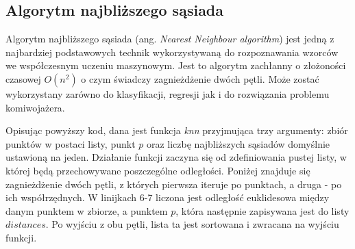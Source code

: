 \documentclass{article}
\begin{document}
\subsection*{\LARGE{Algorytm najbliższego sąsiada}} 

Algorytm najbliższego sąsiada (ang. \emph{Nearest Neighbour algorithm}) jest jedną z najbardziej podstawowych technik wykorzystywaną do rozpoznawania wzorców we współczesnym uczeniu maszynowym. Jest to algorytm zachłanny o złożoności czasowej $O(n^2)$ o czym świadczy zagnieżdżenie dwóch pętli. Może zostać wykorzystany zarówno do klasyfikacji, regresji jak i do rozwiązania problemu komiwojażera. 

\begin{comment}
Chcąc znaleźć najlepsze dopasowanie między dwoma zbiorami punktów potrzebujemy miary tego dopasowania. W tym celu posługujemy sumą odległości korespondujących punktów w metryce euklidesowej. Jeśli przyjmiemy, że po pomiarze odległości danego punktu - staje się on odwiedzony, taką metodę możemy rozpatrywać posługując się terminologią typową dla teorii grafów. Podany algorytm da się rozpisać w postaci listy kroków.

\begin{enumerate}
\item Ustawienie statutu wszystkich punktów jako nieodwiedzone.
\item Wybranie jednego z nich i zmierzenie odległości między nim a punktem $\vb{p}$.
\item Znalezienie najkrótszej odległości między 
\end{enumerate}
\end{comment}

\vspace{5mm}

\vspace{5mm}

Opisując powyższy kod, dana jest funkcja \emph{knn} przyjmująca trzy argumenty: zbiór punktów w postaci listy, punkt $p$ oraz liczbę najbliższych sąsiadów domyślnie ustawioną na jeden. Działanie funkcji zaczyna się od zdefiniowania pustej listy, w której będą przechowywane poszczególne odległości. Poniżej znajduje się zagnieżdżenie dwóch pętli, z których pierwsza iteruje po punktach, a druga - po ich współrzędnych. W linijkach 6-7 liczona jest odległość euklidesowa między danym punktem w zbiorze, a punktem $p$, która następnie zapisywana jest do listy $distances$. Po wyjściu z obu pętli, lista ta jest sortowana i zwracana na wyjściu funkcji.
\end{document}
